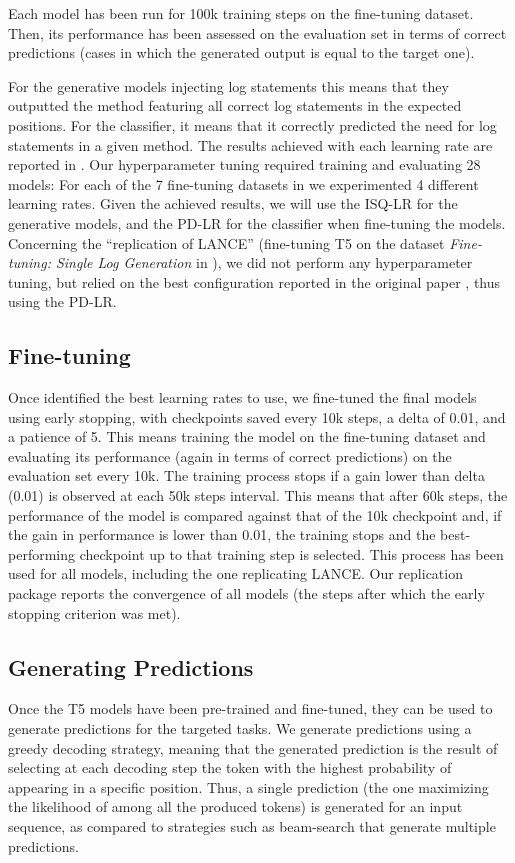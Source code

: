 Each model has been run for 100k training steps on the fine-tuning dataset. Then, its performance has been assessed on the evaluation set in terms of correct predictions (\ie cases in which the generated output is equal to the target one). 

For the generative models injecting log statements this means that they outputted the \java method featuring all correct log statements in the expected positions. For the classifier, it means that it correctly predicted the need for log statements in a given method. The results achieved with each learning rate are reported in . Our hyperparameter tuning required training and evaluating 28 models: For each of the 7 fine-tuning datasets in  we experimented 4 different learning rates. Given the achieved results, we will use the ISQ-LR for the generative models, and the PD-LR for the classifier when fine-tuning the models. Concerning the ``replication of LANCE'' (\ie fine-tuning T5 on the dataset \emph{Fine-tuning: Single Log Generation} in ), we did not perform any hyperparameter tuning, but relied on the best configuration reported in the original paper \cite{mastropaolo2021studying}, thus using the PD-LR.



\subsection{Fine-tuning}
Once identified the best learning rates to use, we fine-tuned the final models using early stopping, with checkpoints saved every 10k steps, a delta of 0.01, and a patience of 5. This means training the model on the fine-tuning dataset and evaluating its performance (again in terms of correct predictions) on the evaluation set every 10k. The training process stops if a gain lower than delta (0.01) is observed at each  50k steps interval. This means that after 60k steps, the performance of the model is compared against that of the 10k checkpoint and, if the gain in performance is lower than 0.01, the training stops and the best-performing checkpoint up to that training step is selected. This process has been used for all models, including the one replicating LANCE. Our replication package \cite{replication} reports the convergence of all models (\ie the steps after which the early stopping criterion was met). 


\subsection{Generating Predictions}
Once the T5 models have been pre-trained and fine-tuned, they can be used to generate predictions for the targeted tasks. We generate predictions using a greedy decoding strategy, meaning that the generated prediction is the result of selecting at each decoding step the token with the highest probability of appearing in a specific position. Thus, a single prediction (\ie the one maximizing the likelihood of among all the produced tokens) is generated for an input sequence, as compared to strategies such as beam-search \cite{freitag2017beam} that generate multiple predictions.
